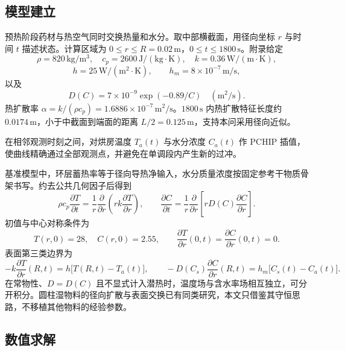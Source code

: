 \subsection{模型建立}

预热阶段药材与热空气同时交换热量和水分。取中部横截面，用径向坐标 $r$ 与时间 $t$ 描述状态。计算区域为 $0\le r\le R=0.02\,\mathrm{m}$，$0\le t\le 1800\,\mathrm{s}$。附录给定
\[
\rho=820\,\mathrm{kg/m^3},\quad
c_p=2600\,\mathrm{J/(kg\cdot K)},\quad
k=0.36\,\mathrm{W/(m\cdot K)},
\]
\[
h=25\,\mathrm{W/(m^2\cdot K)},\qquad
h_m=8\times10^{-7}\,\mathrm{m/s},
\]
以及
\begin{equation}
D(C)=7\times10^{-9}\exp(-0.89/C)\quad(\mathrm{m^2/s}).
\label{eq:q1-D}
\end{equation}
热扩散率 $\alpha=k/(\rho c_p)=1.6886\times10^{-7}\,\mathrm{m^2/s}$。$1800\,\mathrm{s}$ 内热扩散特征长度约 $0.0174\,\mathrm{m}$，小于中截面到端面的距离 $L/2=0.125\,\mathrm{m}$，支持本问采用径向近似。

在相邻观测时刻之间，对烘房温度 $T_a(t)$ 与水分浓度 $C_a(t)$ 作 PCHIP 插值，使曲线精确通过全部观测点，并避免在单调段内产生新的过冲。

基准模型中，环层蓄热率等于径向导热净输入，水分质量浓度按固定参考干物质骨架书写。约去公共几何因子后得到
\begin{equation}
\rho c_p\frac{\partial T}{\partial t}
=\frac1r\frac{\partial}{\partial r}\left(rk\frac{\partial T}{\partial r}\right),
\qquad
\frac{\partial C}{\partial t}
=\frac1r\frac{\partial}{\partial r}\left[rD(C)\frac{\partial C}{\partial r}\right].
\label{eq:q1-pde}
\end{equation}
初值与中心对称条件为
\begin{equation}
T(r,0)=28,\quad C(r,0)=2.55,\qquad
\frac{\partial T}{\partial r}(0,t)=\frac{\partial C}{\partial r}(0,t)=0.
\label{eq:q1-ic}
\end{equation}
表面第三类边界为
\begin{equation}
-k\frac{\partial T}{\partial r}(R,t)=h\bigl[T(R,t)-T_a(t)\bigr],
\qquad
-D(C_s)\frac{\partial C}{\partial r}(R,t)=h_m\bigl[C_s(t)-C_a(t)\bigr].
\label{eq:q1-bc}
\end{equation}
在常物性、$D=D(C)$ 且不显式计入潜热时，温度场与含水率场相互独立，可分开积分。圆柱湿物料的径向扩散与表面交换已有同类研究\cite{hussain2003,dasilva2014}，本文只借鉴其守恒思路，不移植其他物料的经验参数。

\subsection{数值求解}

